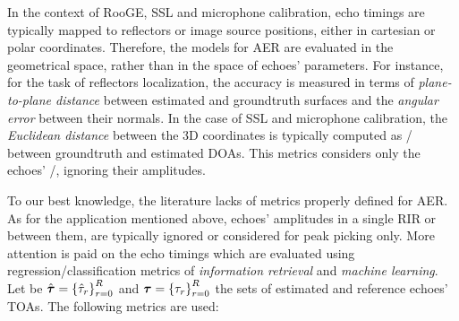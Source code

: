 \mynewline
In the context of \ac{RooGE}, \ac{SSL} and microphone calibration, echo timings are typically mapped to reflectors or image source positions, either in cartesian or polar coordinates.
Therefore, the models for \ac{AER} are evaluated in the geometrical space, rather than in the space of echoes' parameters.
For instance, for the task of reflectors localization, the accuracy is measured in terms of \textit{plane-to-plane distance} between estimated and groundtruth surfaces and the \textit{angular error} between their normals.
In the case of \ac{SSL} and microphone calibration, the \textit{Euclidean distance} between the 3D coordinates is typically computed as \RMSEtxt/ between groundtruth and estimated \acp{DOA}.
This metrics considers only the echoes' \TOA/, ignoring their amplitudes.

\mynewline
To our best knowledge, the literature lacks of metrics properly defined for \ac{AER}.
As for the application mentioned above, echoes' amplitudes in a single \ac{RIR} or between them, are typically ignored or considered for peak picking only.
More attention is paid on the echo timings which are evaluated using regression/classification metrics of \textit{information retrieval} and \textit{machine learning}.
\\Let be $\hat{\boldsymbol{\tau}} = \kbrace{\hat{\tau}_\idxEch}_{\idxEch=0}^{\numEchs}$ and $\boldsymbol{\tau} = \kbrace{\tau_\idxEch}_{\idxEch=0}^{\numEchs}$ the sets of estimated and reference echoes' \acp{TOA}.
The following metrics are used:

